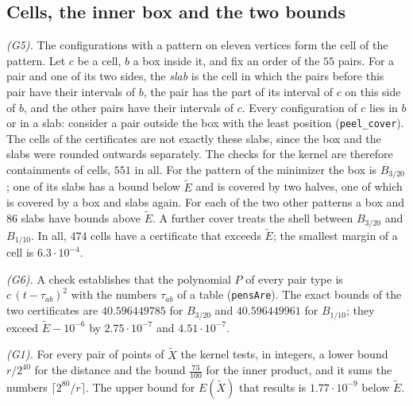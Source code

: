 \documentclass[reqno,a4paper,11pt]{amsart}
\numberwithin{equation}{section}
\newcommand{\lean}[1]{\texttt{#1}}
\newcommand{\factNrgCellsAccepted}{474}
\newcommand{\factNrgCellsMargin}{6.3 \cdot 10^{-4}}
\newcommand{\factNrgCoverChecks}{551}
\newcommand{\factNrgInnerNarrowBound}{40.596449961}
\newcommand{\factNrgInnerNarrowMargin}{4.51 \cdot 10^{-7}}
\newcommand{\factNrgInnerWideBound}{40.596449785}
\newcommand{\factNrgInnerWideMargin}{2.75 \cdot 10^{-7}}
\newcommand{\factNrgSaddleSlabs}{86}
\newcommand{\factNrgUpperGap}{1.77 \cdot 10^{-9}}
\begin{document}
\subsection{Cells, the inner box and the two bounds}

\emph{(G5).} The configurations with a pattern on eleven vertices form the cell of the pattern. Let $c$ be a cell, $b$ a box inside it, and fix an order of the $55$ pairs. For a pair and one of its two sides, the \emph{slab} is the cell in which the pairs before this pair have their intervals of $b$, the pair has the part of its interval of $c$ on this side of $b$, and the other pairs have their intervals of $c$. Every configuration of $c$ lies in $b$ or in a slab: consider a pair outside the box with the least position (\lean{peel\_cover}). The cells of the certificates are not exactly these slabs, since the box and the slabs were rounded outwards separately. The checks for the kernel are therefore containments of cells, $\factNrgCoverChecks$ in all. For the pattern of the minimizer the box is $B_{3/20}$; one of its slabs has a bound below $\tilde E$ and is covered by two halves, one of which is covered by a box and slabs again. For each of the two other patterns a box and $\factNrgSaddleSlabs$ slabs have bounds above $\tilde E$. A further cover treats the shell between $B_{3/20}$ and $B_{1/10}$. In all, $\factNrgCellsAccepted$ cells have a certificate that exceeds $\tilde E$; the smallest margin of a cell is $\factNrgCellsMargin$.

\emph{(G6).} A check establishes that the polynomial $P$ of every pair type is $c \, (t - \tau_{ab})^2$ with the numbers $\tau_{ab}$ of a table (\lean{pensAre}). The exact bounds of the two certificates are $\factNrgInnerWideBound$ for $B_{3/20}$ and $\factNrgInnerNarrowBound$ for $B_{1/10}$; they exceed $\tilde E - 10^{-6}$ by $\factNrgInnerWideMargin$ and $\factNrgInnerNarrowMargin$.

\emph{(G1).} For every pair of points of $\tilde X$ the kernel tests, in integers, a lower bound $r/2^{40}$ for the distance and the bound $\tfrac{73}{100}$ for the inner product, and it sums the numbers $\lceil 2^{80}/r \rceil$. The upper bound for $E(\tilde X)$ that results is $\factNrgUpperGap$ below $\tilde E$.
\end{document}
